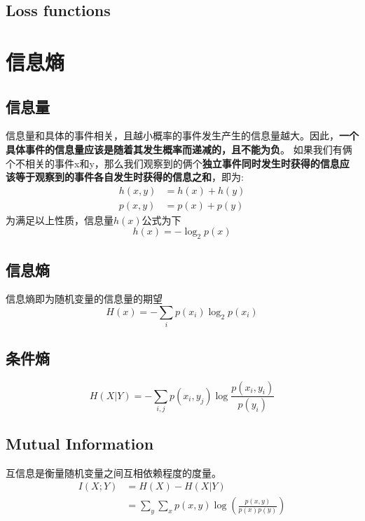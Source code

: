 \subsection{Loss functions}



\section{信息熵}
\subsection{信息量}
信息量和具体的事件相关，且越小概率的事件发生产生的信息量越大。因此，\textbf{一个具体事件的信息量应该是随着其发生概率而递减的，且不能为负}。
如果我们有俩个不相关的事件x和y，那么我们观察到的俩个\textbf{独立事件同时发生时获得的信息应该等于观察到的事件各自发生时获得的信息之和}，即为:
\begin{equation}
    \begin{split}
        h(x, y) &= h(x) + h(y) \\
        p(x, y) &= p(x) + p(y)
    \end{split}
\end{equation}
为满足以上性质，信息量$h(x)$公式为下
\begin{equation}
    h(x) = -\log_2p(x)
\end{equation}
\subsection{信息熵}
信息熵即为随机变量的信息量的期望
\begin{equation}
    H(x) = -\sum_ip(x_i)\log_2p(x_i)
\end{equation}
\subsection{条件熵}
\begin{equation}
    H(X|Y) = -\sum_{i,j}p(x_i, y_j)\log \frac{p(x_i, y_i)}{p(y_i)}
\end{equation}

\subsection{Mutual Information}
互信息是衡量随机变量之间互相依赖程度的度量。
\begin{equation}
    \begin{split}
        I(X;Y) &= H(X) - H(X|Y) \\
        &=\sum_y\sum_x p(x, y)\log(\frac{p(x, y)}{p(x)p(y)})
    \end{split}
\end{equation}

